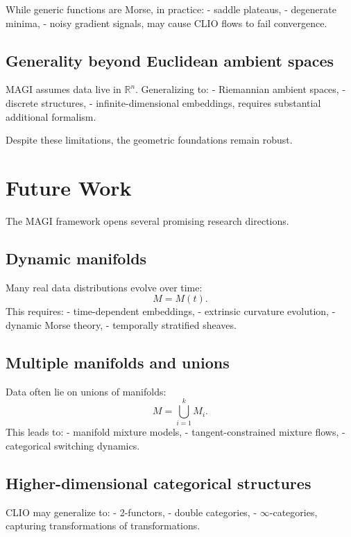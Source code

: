 \documentclass[11pt,a4paper,twocolumn]{article}
\begin{document}
While generic functions are Morse, in practice:
- saddle plateaus,
- degenerate minima,
- noisy gradient signals,
may cause CLIO flows to fail convergence.

\subsection{Generality beyond Euclidean ambient spaces}

MAGI assumes data live in $\mathbb{R}^n$.  
Generalizing to:
- Riemannian ambient spaces,
- discrete structures,
- infinite-dimensional embeddings,
requires substantial additional formalism.

Despite these limitations, the geometric foundations remain robust.



\section{Future Work}

The MAGI framework opens several promising research directions.

\subsection{Dynamic manifolds}

Many real data distributions evolve over time:
\[
M = M(t).
\]
This requires:
- time-dependent embeddings,
- extrinsic curvature evolution,
- dynamic Morse theory,
- temporally stratified sheaves.

\subsection{Multiple manifolds and unions}

Data often lie on unions of manifolds:
\[
M = \bigcup_{i=1}^k M_i.
\]
This leads to:
- manifold mixture models,
- tangent-constrained mixture flows,
- categorical switching dynamics.

\subsection{Higher-dimensional categorical structures}

CLIO may generalize to:
- 2-functors,
- double categories,
- $\infty$-categories,
capturing transformations of transformations.
\end{document}

